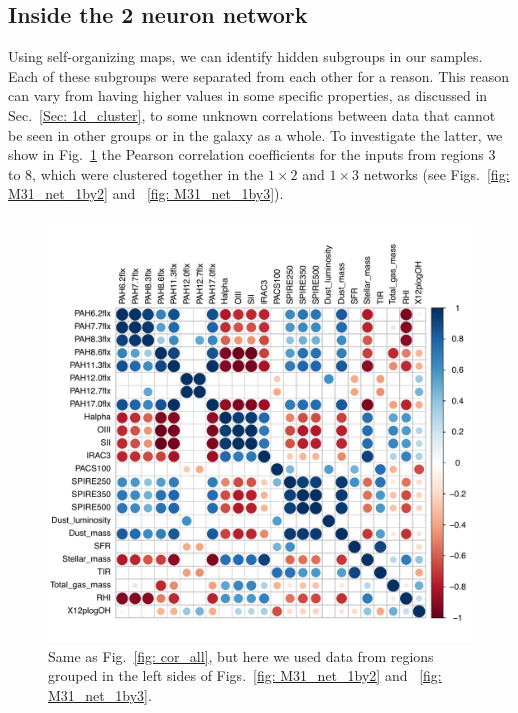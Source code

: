         
    \subsection{Inside the 2 neuron network}
    
        \label{sec: inside_the_2_neurons}
        Using self-organizing maps, we can identify hidden subgroups in our samples. 
        Each of these subgroups were separated from each other for a reason.
        This reason can vary from having higher values in some specific properties, as discussed in Sec.~\ref{Sec: 1d_cluster}, to some unknown correlations between data that cannot be seen in other groups or in the galaxy as a whole.
        To investigate the latter, we show in Fig.~\ref{fig: cor_cluster1} the Pearson correlation coefficients for the inputs from regions 3 to 8, which were clustered together in the $1\times2$ and $1\times3$ networks (see Figs.~\ref{fig: M31_net_1by2} and ~\ref{fig: M31_net_1by3}).
        
        \begin{figure}
        \includegraphics[width=\textwidth]{../images0.01/cor_plots/M31_derived_3_to_8_core_plot_for_paper.pdf}
        \caption{Same as Fig.~\ref{fig: cor_all}, but here we used data from regions grouped in the left sides of Figs.~\ref{fig: M31_net_1by2} and ~\ref{fig: M31_net_1by3}. }
          \label{fig: cor_cluster1}
        \end{figure}
        
